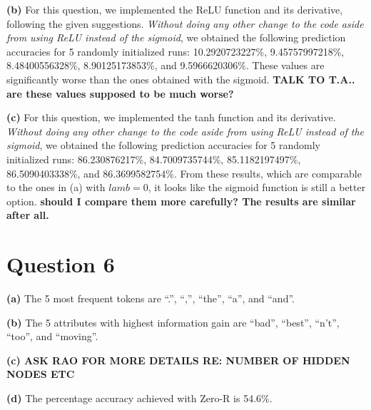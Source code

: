 \documentclass[leqno]{article}
\begin{document}
\hfill 

\noindent \textbf{(b)} For this question, we implemented the ReLU function and its derivative, following the given suggestions. \textit{Without doing any other change to 
the code aside from using ReLU instead of the sigmoid}, we obtained the following prediction accuracies for 5 randomly initialized runs: 
10.2920723227\%, 9.45757997218\%, 8.48400556328\%, 8.90125173853\%, and 9.5966620306\%. These values are significantly worse than the ones obtained with the 
sigmoid. \textbf{TALK TO T.A.. are these values supposed to be much worse?}

\hfill

\noindent \textbf{(c)} For this question, we implemented the tanh function and its derivative. \textit{Without doing any other change to 
the code aside from using ReLU instead of the sigmoid}, we obtained the following prediction accuracies for 5 randomly initialized runs:
86.230876217\%, 84.7009735744\%, 85.1182197497\%, 86.5090403338\%, and 86.3699582754\%. From these results, which are comparable to the 
ones in (a) with $lamb = 0$, it looks like the sigmoid function is still a better option. \textbf{should I compare them more carefully? 
The results are similar after all.} 

\hfill

\section*{Question 6} \textbf{(a)} The 5 most frequent tokens are ``.'', ``,'', ``the'', ``a'', and 
``and''.

\hfill

\noindent \textbf{(b)} The 5 attributes with highest information gain are ``bad'', ``best'', ``n't'', ``too'', and ``moving''. 

\hfill

\noindent \textbf{(c) ASK RAO FOR MORE DETAILS RE: NUMBER OF HIDDEN NODES ETC}

\hfill

\noindent \textbf{(d)} The percentage accuracy achieved with Zero-R is 54.6\%. 
\end{document}
